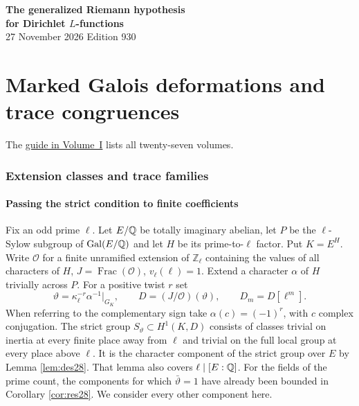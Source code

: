 \documentclass[a4paper,11pt]{article}
\theoremstyle{definition}
\theoremstyle{remark}
\newcommand{\ZZ}{\mathbb Z}\newcommand{\ord}{\operatorname{ord}}
\numberwithin{equation}{section}
\newcommand{\OO}{\mathcal O}
\begin{document}
\setcounter{part}{5}
\thispagestyle{plain}\begin{center}
{\LARGE\bfseries The generalized Riemann hypothesis\\[2pt]for Dirichlet \(L\)-functions}\\[6pt]
{\small 27 November 2026 \quad\textperiodcentered\quad Edition 930}\end{center}
\part{Marked Galois deformations and trace congruences}\label{part:VI}
\begin{abstract}\noindent We relate strict extension classes to rank-three Galois representations. We calculate tangent spaces of ordinary deformations, distinguish orthogonal components, and compare their trace congruences on the common interval.\end{abstract}
\setcounter{section}{29}
\noindent The \hyperref[seriesguide]{guide in Volume~I} lists all twenty-seven volumes.
\begingroup\small\setlength{\parskip}{0pt}\tableofcontents\endgroup
\clearpage

\section{Extension classes and trace families}\label{nav:g-IV-0}\label{nav:volume-VI}

\subsection{Passing the strict condition to finite coefficients}\label{nav:IV-00}
\label{sec:strict31}

Fix an odd prime \(\ell\). Let \(E/\mathbb Q\) be totally imaginary abelian, let \(P\) be the \(\ell\)-Sylow subgroup of \(\operatorname{Gal}(E/\mathbb Q)\) and let \(H\) be its prime-to-\(\ell\) factor. Put \(K=E^H\). Write \(\OO\) for a finite unramified extension of \(\ZZ_\ell\) containing the values of all characters of \(H\), \(J=\operatorname{Frac}(\OO)\), \(v_\ell(\ell)=1\). Extend a character \(\alpha\) of \(H\) trivially across \(P\). For a positive twist \(r\) set
\[
 \vartheta=\kappa_\ell^{-r}\alpha^{-1}|_{G_K},\qquad
 D=(J/\OO)(\vartheta),\qquad D_m=D[\ell^m].
\]
When referring to the complementary sign take \(\alpha(c)=(-1)^r\), with \(c\) complex conjugation. The strict group \(S_\vartheta\subset H^1(K,D)\) consists of classes trivial on inertia at every finite place away from \(\ell\) and trivial on the full local group at every place above \(\ell\). It is the character component of the strict group over \(E\) by Lemma \ref{lem:des28}. That lemma also covers \(\ell\mid [E:\mathbb Q]\). For the fields of the prime count, the components for which \(\bar\vartheta=1\) have already been bounded in Corollary \ref{cor:res28}. We consider every other component here.
\end{document}

